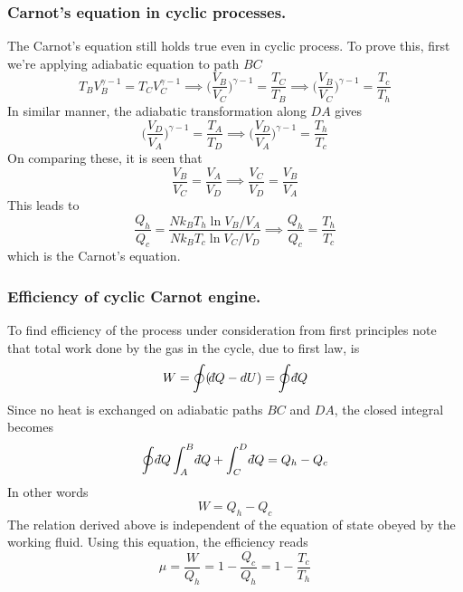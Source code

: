 \documentclass[../../../Main.tex]{subfiles}
\begin{document}
\subsubsection{Carnot's equation in cyclic processes.} The Carnot's equation still holds true even in cyclic process. To prove this, first we're applying adiabatic equation to path $BC$
\begin{equation*}
    T_BV_B^{\gamma-1}=T_CV_C^{\gamma-1}\implies \biggl(\frac{V_B}{V_C}\biggr)^{\gamma-1}=\frac{T_C}{T_B}\implies\biggl(\frac{V_B}{V_C}\biggr)^{\gamma-1}=\frac{T_c}{T_h}
\end{equation*}
In similar manner, the adiabatic transformation along $ D A$ gives
\begin{equation*}
    \biggl(\frac{V_D}{V_A}\biggr)^{\gamma-1}=\frac{T_A}{T_D}\implies \biggl(\frac{V_D}{V_A}\biggr)^{\gamma-1}=\frac{T_h}{T_c}
\end{equation*}
On comparing these, it is seen that
\begin{equation*}
    \frac{V_B}{V_C}=\frac{V_A}{V_D}\implies\frac{V_C}{V_D}=\frac{V_B}{V_A}
\end{equation*}
This leads to 
\begin{equation*}
    \frac{Q_h}{Q_c}=\frac{Nk_BT_h\ln{V_B}/{V_A}}{Nk_BT_c\ln{V_C}/{V_D}}\implies \frac{Q_h}{Q_c}=\frac{T_h}{T_c}
\end{equation*}
which is the Carnot's equation.

\subsubsection{Efficiency of cyclic Carnot engine.} To find efficiency of the process under consideration from first principles note that total work done by the gas in the cycle, due to first law, is
\begin{equation*}
    W=\oint(\dbar Q-dU)=\oint \dbar Q
\end{equation*}
Since no heat is exchanged on adiabatic paths $BC$ and $DA$, the closed integral becomes 
\begin{equation*}
    \oint \dbar Q\int_{A}^{B} \dbar Q+\int_{C}^{D} \dbar Q=Q_h-Q_c
\end{equation*}
In other words
\begin{equation*}
    W=Q_h-Q_c
\end{equation*}
The relation derived above is independent of the equation of state obeyed by the working fluid. Using this equation, the efficiency reads 
\begin{equation*}
    \mu=\frac{W}{Q_h}=1-\frac{Q_c}{Q_h}=1-\frac{T_c}{T_h}
\end{equation*}
\end{document}
